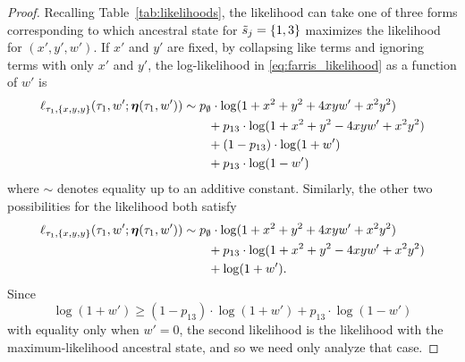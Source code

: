 \restrictedBranchInconsist*

\begin{proof}
Recalling Table~\ref{tab:likelihoods}, the likelihood can take one of three forms corresponding to which ancestral state for $\tilde{s}_j=\{1,3\}$ maximizes the likelihood for $(x',y',w')$.
If $x'$ and $y'$ are fixed, by collapsing like terms and ignoring terms with only $x'$ and $y'$, the log-likelihood in \eqref{eq:farris_likelihood} as a function of $w'$ is
\begin{align*}
    \ell_{\tau_1,\{x,y,y\}}(\tau_1, w'; \boldsymbol\eta(\tau_1,w'))
    &\sim     p_{\emptyset}  \cdot\log(1+x^2+y^2+4xyw'+x^2y^2) \\
    &\qquad + p_{13}         \cdot\log(1+x^2+y^2-4xyw'+x^2y^2) \\
    &\qquad + (1 - p_{13})\cdot\log(1+w') \\
    &\qquad + p_{13}\cdot\log(1-w')
\end{align*}
where $\sim$ denotes equality up to an additive constant.
Similarly, the other two possibilities for the likelihood both satisfy
\begin{align*}
    \ell_{\tau_1,\{x,y,y\}}(\tau_1, w'; \boldsymbol\eta(\tau_1,w'))
    &\sim     p_{\emptyset}  \cdot\log(1+x^2+y^2+4xyw'+x^2y^2) \\
    &\qquad + p_{13}         \cdot\log(1+x^2+y^2-4xyw'+x^2y^2) \\
    &\qquad + \log(1+w').
\end{align*}
Since
$$
\log(1+w') \geq (1 - p_{13})\cdot\log(1+w') + p_{13}\cdot\log(1-w')
$$
with equality only when $w'=0$, the second likelihood is the likelihood with the maximum-likelihood ancestral state, and so we need only analyze that case.


\end{proof}
